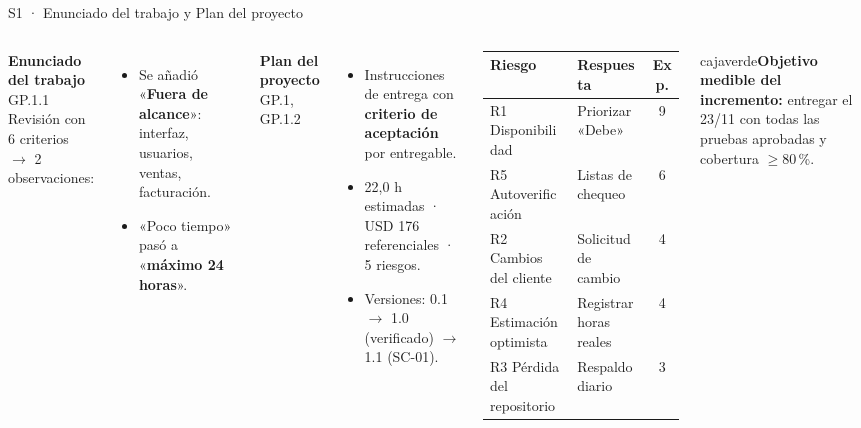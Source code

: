 \documentclass[aspectratio=169,11pt]{beamer}
\newcommand{\caja}[3]{\begin{beamercolorbox}[wd=\dimexpr\linewidth-12pt\relax,sep=6pt,rounded=true]{#1}#3\end{beamercolorbox}}
\begin{document}
\begin{frame}{S1 · Enunciado del trabajo y Plan del proyecto}
\begin{columns}[T,onlytextwidth]
\textbf{Enunciado del trabajo} \hfill{\scriptsize GP.1.1}\\[0.1cm]
{\small Revisión con 6 criterios $\rightarrow$ 2 observaciones:}
\begin{itemize}\footnotesize
  \item Se añadió «\textbf{Fuera de alcance}»: interfaz, usuarios, ventas, facturación.
  \item «Poco tiempo» pasó a «\textbf{máximo 24 horas}».
\end{itemize}
\vspace{0.2cm}
\textbf{Plan del proyecto} \hfill{\scriptsize GP.1, GP.1.2}
\begin{itemize}\footnotesize
  \item Instrucciones de entrega con \textbf{criterio de aceptación} por entregable.
  \item 22,0 h estimadas · USD 176 referenciales · 5 riesgos.
  \item Versiones: 0.1 $\rightarrow$ 1.0 (verificado) $\rightarrow$ 1.1 (SC-01).
\end{itemize}
\scriptsize
\begin{tabularx}{\linewidth}{@{}L L c@{}}
\toprule
\textbf{Riesgo} & \textbf{Respuesta} & \textbf{Exp.} \\
\midrule
R1 Disponibilidad & Priorizar «Debe» & 9 \\
R5 Autoverificación & Listas de chequeo & 6 \\
R2 Cambios del cliente & Solicitud de cambio & 4 \\
R4 Estimación optimista & Registrar horas reales & 4 \\
R3 Pérdida del repositorio & Respaldo diario & 3 \\
\bottomrule
\end{tabularx}

\vspace{0.3cm}
\caja{cajaverde}{}{\footnotesize\textbf{Objetivo medible del incremento:} entregar el 23/11 con todas las pruebas aprobadas y cobertura $\geq 80$\,\%.}
\end{columns}
\end{frame}
\end{document}
